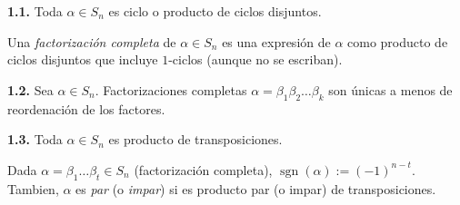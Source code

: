 \begin{theorem}
    \textbf{1.1.} Toda \(\alpha \in S_n\) es ciclo o producto de ciclos disjuntos. %
\end{theorem}


\begin{definition}
    Una \emph{factorización completa} de \(\alpha\in S_n\) es una expresión de \(\alpha\) como producto de ciclos disjuntos que incluye \(1\)-ciclos (aunque no se escriban). 
\end{definition}

\begin{theorem}
    \textbf{1.2.} Sea \(\alpha \in S_n\). Factorizaciones completas \(\alpha = \beta_1\beta_2 \ldots\beta_k\) son únicas a menos de reordenación de los factores. %
\end{theorem}


\begin{theorem}
    \textbf{1.3.} Toda \(\alpha \in S_n\) es producto de transposiciones. 
\end{theorem}



\newcommand{\sgn}{\operatorname{sgn}}
\begin{definition}
    Dada \(\alpha = \beta_1 \ldots\beta_t  \in S_n\) (factorización completa), \(\sgn(\alpha):= (-1)^{n-t}\). Tambien, \(\alpha \) es \emph{par} (o \emph{impar}) si es producto par (o impar) de transposiciones.
\end{definition}

